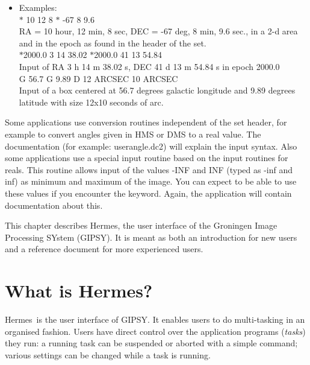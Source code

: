 \begin{itemize}

    \item Examples:   \\

        $\ast$ 10 12 8 $\ast$ -67 8 9.6      \\

        RA = 10 hour, 12 min, 8 sec, DEC = -67 deg, 8 min, 9.6 sec.,
        in a 2-d area and in the epoch as found in the header of the set. \\

        $\ast$2000.0 3 14 38.02 $\ast$2000.0 41 13 54.84 \\
        
        Input of RA  3 h 14 m 38.02 s, DEC 41 d 13 m 54.84 s in
        epoch 2000.0 \\

        G 56.7 G 9.89 D 12 ARCSEC 10 ARCSEC \\
        Input of a box centered at 56.7 degrees galactic longitude
        and 9.89 degrees latitude with size 12x10 seconds of arc.

\end{itemize}

Some applications use conversion routines independent of  the set header, 
for example to convert angles given in HMS or DMS to a real value. The 
documentation (for example: userangle.dc2) will explain the input syntax.
Also some applications use a special input routine based on the input 
routines for reals. This routine allows input of the values -INF and INF 
(typed as -inf and inf)
as minimum and maximum of the image. You can expect to be able to use these 
values if you encounter the  keyword. Again, the application
will contain documentation about this.
                
        

\def\H{{Hermes}}
\def\tH{{tHermes}}
\def\xH{{xHermes}}
\def\nH{{nHermes}}
\def\G{{GIPSY}}

\label{chapter:Hermes}

This chapter describes \H, the user interface of the
Groningen Image Processing SYstem (\G).
It is meant as both an introduction for new users and
a reference document for more experienced users.
\bigskip


\section{What is \H ?}
\H\ is the user interface of \G.
It enables users to do multi-tasking in an organised fashion.
Users have direct control over the application programs ({\em tasks\/}) they run:
a running task can be suspended or aborted with a simple command; various
settings can be changed while a task is running.


